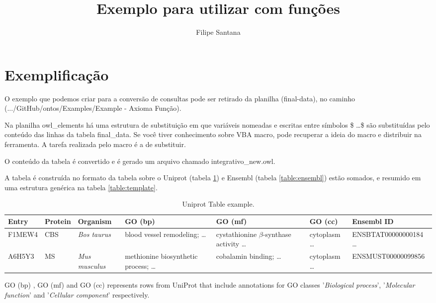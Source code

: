\documentclass[]{scrartcl}
\title{Exemplo para utilizar com funções}
\author{Filipe Santana}
\begin{document}
\maketitle

\section{Exemplificação}

O exemplo que podemos criar para a conversão de consultas pode ser retirado da planilha (final-data), no caminho (.../GitHub/ontos/Examples/Example - Axioma Função).

Na planilha owl\_elements há uma estrutura de substituição em que variáveis nomeadas e escritas entre símbolos \$ \ldots \$ são substituídas pelo conteúdo das linhas da tabela final\_data.
Se você tiver conhecimento sobre VBA macro, pode recuperar a ideia do macro e distribuir na ferramenta. A tarefa realizada pelo macro é a de substituir.

O conteúdo da tabela é convertido e é gerado um arquivo chamado integrativo\_new.owl.

A tabela é construída no formato da tabela sobre o Uniprot (tabela \ref{table:uniprot}) e Ensembl (tabela \ref{table:ensembl}) estão somados, e resumido em uma estrutura genérica na tabela \ref{table:template}.

\begin{table}[h!]
	\begin{threeparttable}
		\caption{Uniprot Table example.}
		\label{table:uniprot}
		\centering
		\begin{tabular}{p{0.5in}p{0.4in}p{0.5in}p{0.7in}p{0.8in}p{0.7in}p{1.2in}} 
			\hline 
			Entry & Protein & Organism & GO (bp) & GO (mf) & GO (cc) & Ensembl ID \\ \hline 
			F1MEW4 & CBS & \textit{Bos taurus} & blood vessel remodeling; \ldots & cystathionine $\beta$-synthase activity \ldots & cytoplasm \ldots & ENSBTAT00000000184 \ldots \\ 
			A6H5Y3 & MS & \textit{Mus musculus} & methionine biosynthetic process; \ldots & cobalamin binding; \ldots & cytoplasm \ldots & ENSMUST00000099856 \\ \hline 
		\end{tabular}
		\begin{tablenotes}
			\item GO (bp) , GO (mf) and GO (cc) represents rows from UniProt that include annotations for GO classes
			'\textit{Biological process}', '\textit{Molecular function}' and '\textit{Cellular component}' respectively.
		\end{tablenotes}
	\end{threeparttable}
\end{table}
\end{document}
